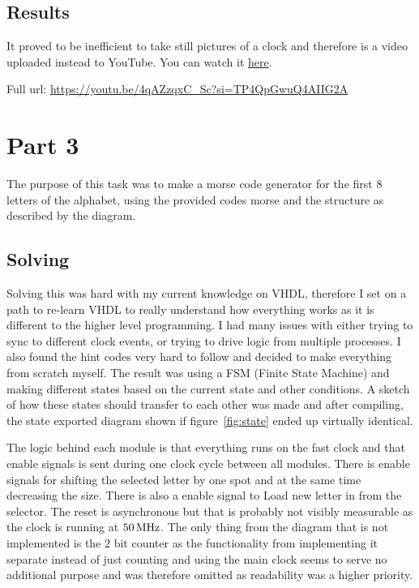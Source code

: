 \documentclass{article}
\begin{document}
\clearpage
\subsection{Results}
It proved to be inefficient to take still pictures of a clock and therefore is a video uploaded instead to YouTube. You can watch it \href{https://youtu.be/4qAZzqxC_Sc?si=TP4QpGwuQ4AIIG2A}{here}. \par
Full url: \url{https://youtu.be/4qAZzqxC_Sc?si=TP4QpGwuQ4AIIG2A}

\section{Part 3}
The purpose of this task was to make a morse code generator for the first 8 letters of the alphabet, using the provided codes morse and the structure as described by the diagram.


\subsection{Solving}
Solving this was hard with my current knowledge on VHDL, therefore I set on a path to re-learn VHDL to really understand how everything works as it is different to the higher level programming. I had many issues with either trying to sync to different clock events, or trying to drive logic from multiple processes. I also found the hint codes very hard to follow and decided to make everything from scratch myself. The result was using a FSM (Finite State Machine) and making different states based on the current state and other conditions. A sketch of how these states should transfer to each other was made and after compiling, the state exported diagram shown if figure~\ref{fig:state} ended up virtually identical. \par

The logic behind each module is that everything runs on the fast clock and that enable signals is sent during one clock cycle between all modules. There is enable signals for shifting the selected letter by one spot and at the same time decreasing the size. There is also a enable signal to Load new letter in from the selector. The reset is asynchronous but that is probably not visibly measurable as the clock is running at \(\unit[50]{MHz}\). The only thing from the diagram that is not implemented is the \(2\) bit counter as the functionality from implementing it separate instead of just counting and using the main clock seems to serve no additional purpose and was therefore omitted as readability was a higher priority.
\end{document}
